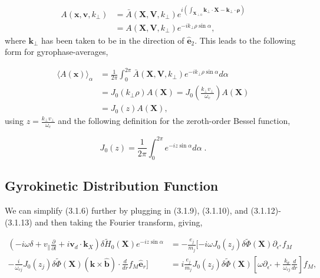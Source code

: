 \documentclass[12pt]{article}
\numberwithin{equation}{subsection}
\begin{document}
   \begin{equation}
   \begin{aligned}
      A(\bm{x}, \bm{v}, k_\perp) &= \bar{A}(\bm{X},\bm{V},k_\perp)e^{i(\int_{\bm{X}_{\perp 0}}\bm{k}_\perp\cdot\bm{X} - \bm{k}_\perp\cdot\bm{\rho})} \\
                                 &= A(\bm{X},\bm{V},k_\perp)e^{-i k_\perp\rho\sin\alpha},
   \end{aligned}                              
   \end{equation}
where $\bm{k}_\perp$ has been taken to be in the direction of $\bm{\hat{e}}_2$. This leads to the following form for gyrophase-averages,

   \begin{equation}
   \begin{aligned}
      \langle A(\bm{x})\rangle_\alpha &= \frac{1}{2\pi}\int_{0}^{2\pi}\bar{A}(\bm{X},\bm{V},k_\perp)e^{-i k_\perp\rho\sin\alpha} d\alpha \\
                                      &= J_0(k_\perp \rho) A(\bm{X}) = J_0(\frac{k_\perp v_{\perp}}{\omega_c})A(\bm{X}) \\
                                      &= J_0(z)A(\bm{X}),
   \end{aligned}
   \end{equation}
using $z = \frac{k_\perp v_\perp}{\omega_c}$ and the following definition for the zeroth-order Bessel function,
   
   \begin{equation}
      J_0(z) = \frac{1}{2\pi}\int_{0}^{2\pi}e^{-iz\sin\alpha}d\alpha\;.
   \end{equation}

\subsection{Gyrokinetic Distribution Function}
   \quad We can simplify (3.1.6) further by plugging in (3.1.9), (3.1.10), and (3.1.12)-(3.1.13) and then taking the Fourier transform, giving,

   \begin{equation}
   \begin{aligned}
      (-i\omega\delta + v_\parallel\frac{\partial}{\partial l} + i \bm{v}_d\cdot\bm{k}_X)\delta\widetilde{H}_0(\bm{X})e^{-iz\sin\alpha} &=
      -\frac{e_j}{m_j}[-i\omega J_0(z_j)\delta\widetilde{\Phi}(\bm{X})\partial_{\epsilon^*}f_M \\
      -\frac{i}{\omega_{cj}}J_0(z_j)\delta\widetilde{\Phi}(\bm{X})(\bm{k}\times\bm{\hat{b}})\cdot\frac{d}{dr} f_M\bm{\hat{e}}_r] &=
      i\frac{e_j}{m_j}J_0(z_j)\delta\widetilde{\Phi}(\bm{X})[\omega\partial_{\epsilon^*} + \frac{k_\theta}{\omega_{cj}}\frac{d}{dr}]f_M,
   \end{aligned}
   \end{equation}
\end{document}
